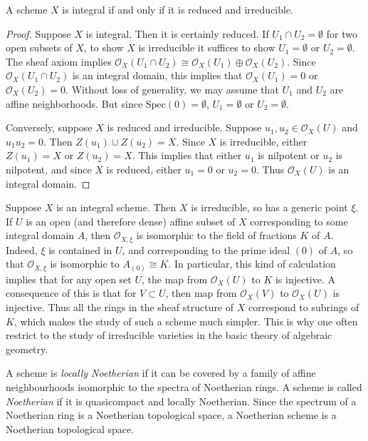 \begin{theorem}
    A scheme $X$ is integral if and only if it is reduced and irreducible.
\end{theorem}
\begin{proof}
    Suppose $X$ is integral. Then it is certainly reduced. If $U_1 \cap U_2 = \emptyset$ for two open subsets of $X$, to show $X$ is irreducible it suffices to show $U_1 = \emptyset$ or $U_2 = \emptyset$. The sheaf axiom implies $\mathcal{O}_X(U_1 \cap U_2) \cong \mathcal{O}_X(U_1) \oplus \mathcal{O}_X(U_2)$. Since $\mathcal{O}_X(U_1 \cap U_2)$ is an integral domain, this implies that $\mathcal{O}_X(U_1) = 0$ or $\mathcal{O}_X(U_2) = 0$. Without loss of generality, we may assume that $U_1$ and $U_2$ are affine neighborhoods. But since $\text{Spec}(0) = \emptyset$, $U_1 = \emptyset$ or $U_2 = \emptyset$.

    Conversely, suppose $X$ is reduced and irreducible. Suppose $u_1,u_2 \in \mathcal{O}_X(U)$ and $u_1u_2 = 0$. Then $Z(u_1) \cup Z(u_2) = X$. Since $X$ is irreducible, either $Z(u_1) = X$ or $Z(u_2) = X$. This implies that either $u_1$ is nilpotent or $u_2$ is nilpotent, and since $X$ is reduced, either $u_1 = 0$ or $u_2 = 0$. Thus $\mathcal{O}_X(U)$ is an integral domain.
\end{proof}

Suppose $X$ is an integral scheme. Then $X$ is irreducible, so has a generic point $\xi$. If $U$ is an open (and therefore dense) affine subset of $X$ corresponding to some integral domain $A$, then $\mathcal{O}_{X,\xi}$ is isomorphic to the field of fractions $K$ of $A$. Indeed, $\xi$ is contained in $U$, and corresponding to the prime ideal $(0)$ of $A$, so that $\mathcal{O}_{X,\xi}$ is isomorphic to $A_{(0)} \cong K$. In particular, this kind of calculation implies that for any open set $U$, the map from $\mathcal{O}_X(U)$ to $K$ is injective. A consequence of this is that for $V \subset U$, then map from $\mathcal{O}_X(V)$ to $\mathcal{O}_X(U)$ is injective. Thus all the rings in the sheaf structure of $X$ correspond to subrings of $K$, which makes the study of such a scheme much simpler. This is why one often restrict to the study of irreducible varieties in the basic theory of algebraic geometry.

A scheme is \emph{locally Noetherian} if it can be covered by a family of affine neighbourhoods isomorphic to the spectra of Noetherian rings. A scheme is called \emph{Noetherian} if it is quasicompact and locally Noetherian. Since the spectrum of a Noetherian ring is a Noetherian topological space, a Noetherian scheme is a Noetherian topological space.

